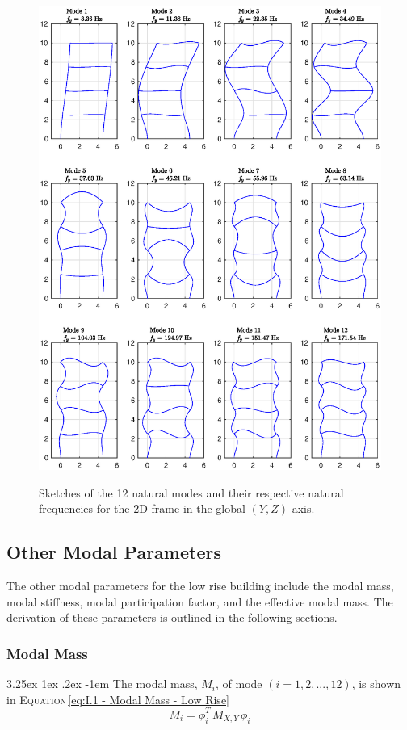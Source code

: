 \documentclass[11pt,a4paper,titlepage]{report}
\makeatletter
\renewcommand\paragraph{\@startsection{paragraph}{5}{\z@}%
  {3.25ex \@plus1ex \@minus.2ex}%
  {-1em}%
  {\normalfont\normalsize\bfseries}}
\makeatother
\begin{document}
\begin{figure}
    \centering
    \includegraphics[width=16cm]{Mode_Shapes_Y.eps}
\label{fig: I.1 - modes shapes y}
 \caption{Sketches of the 12 natural modes and their respective natural frequencies for the 2D frame in the global $(Y,Z)$ axis.}
\end{figure}
\newpage
\subsection{Other Modal Parameters}
The other modal parameters for the low rise building include the modal mass, modal stiffness, modal participation factor, and the effective modal mass. The derivation of these parameters is outlined in the following sections.
\subsubsection{Modal Mass}
\paragraph{} The modal mass, $M_i$, of mode $(i = 1,2,...,12)$, is shown in \textsc{Equation}\,\ref{eq:I.1 - Modal Mass - Low Rise}
\begin{equation}
    M_i = \phi_i^T\,M_{X,Y}\,\phi_i
    \label{eq:I.1 - Modal Mass - Low Rise}
\end{equation}
\end{document}
